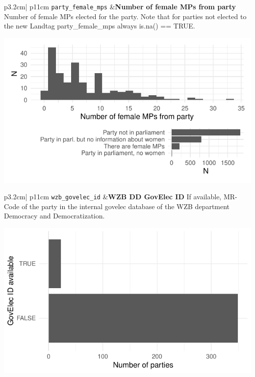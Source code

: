 \documentclass[
]{article}
\begin{document}
\begin{longtable}{p{3.2cm}| p{11cm}}
\texttt{party\_female\_mps} &\textbf{Number of female MPs from party}\newline 
Number of female MPs elected for the party. Note that for parties not elected to the new Landtag party\_female\_mps always is.na() == TRUE.

\hspace*{.25cm}
\begin{minipage}[t]{\linewidth }
\vspace{0pt}
\includegraphics[width = \linewidth]{cbelec/pfmpcplot.pdf}
\end{minipage}


\end{longtable}

\begin{longtable}{p{3.2cm}| p{11cm}}
\texttt{wzb\_govelec\_id} &\textbf{WZB DD GovElec ID}\newline 
If available, MR-Code of the party in the internal govelec database of the WZB department Democracy and Democratization.


\hspace*{.25cm}
\begin{minipage}[t]{\linewidth }
\vspace{0pt}
\includegraphics[width = \linewidth]{cbelec/govelecplot.pdf}
\end{minipage}


\end{longtable}
\end{document}
